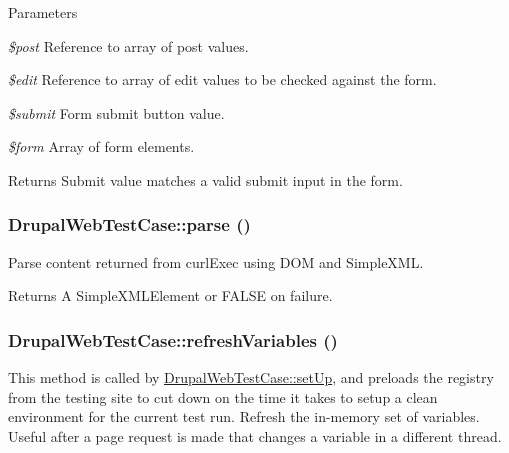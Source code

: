 \begin{DoxyParams}{Parameters}
\item[{\em \$post}]Reference to array of post values. \item[{\em \$edit}]Reference to array of edit values to be checked against the form. \item[{\em \$submit}]Form submit button value. \item[{\em \$form}]Array of form elements. \end{DoxyParams}
\begin{DoxyReturn}{Returns}
Submit value matches a valid submit input in the form. 
\end{DoxyReturn}
\hypertarget{class_drupal_web_test_case_a19289cdf27c85cad8e10960769d1e28b}{
\subsubsection[{parse}]{\setlength{\rightskip}{0pt plus 5cm}DrupalWebTestCase::parse ()}}
\label{class_drupal_web_test_case_a19289cdf27c85cad8e10960769d1e28b}
Parse content returned from curlExec using DOM and SimpleXML.

\begin{DoxyReturn}{Returns}
A SimpleXMLElement or FALSE on failure. 
\end{DoxyReturn}
\hypertarget{class_drupal_web_test_case_ad82b8c5cdc60fb19c9550ab7ba3fd017}{
\subsubsection[{refreshVariables}]{\setlength{\rightskip}{0pt plus 5cm}DrupalWebTestCase::refreshVariables ()}}
\label{class_drupal_web_test_case_ad82b8c5cdc60fb19c9550ab7ba3fd017}
This method is called by \hyperlink{class_drupal_web_test_case_a110ecf5deb57ee6a908617360c1f6ec4}{DrupalWebTestCase::setUp}, and preloads the registry from the testing site to cut down on the time it takes to setup a clean environment for the current test run. Refresh the in-\/memory set of variables. Useful after a page request is made that changes a variable in a different thread.


